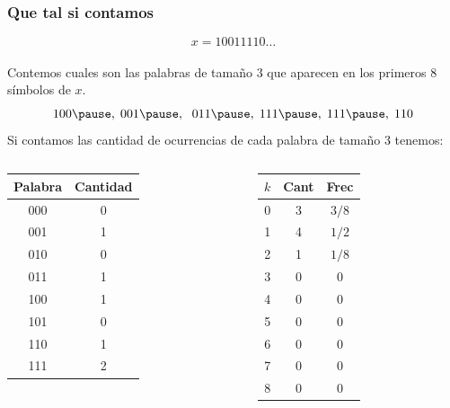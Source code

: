 \documentclass[10pt,mathserif]{beamer}%
\begin{document}
\begin{frame}
  \frametitle{Que tal si contamos}
  $$x = 10011110\dots$$
  \\
  Contemos cuales son las palabras de tamaño 3 que aparecen en los primeros 8 símbolos de $x$.
  \pause
  $$100\pause, \; 001\pause, \ \; 011\pause,\; 111\pause,\; 111\pause,\; 110$$
  \pause
  Si contamos las cantidad de ocurrencias de cada palabra de tamaño 3 tenemos: 
  \begin{columns}
    \begin{column}{0.5\textwidth}
      \begin{center}
      \begin{tabular}{|c | c|} 
    \hline
    Palabra & Cantidad \\ [0.5ex] 
    \hline
    000 & 0 \\ 
    \hline
    001 & 1 \\ 
    \hline
    010 & 0 \\ 
    \hline
    011 & 1 \\ 
    \hline
    100 & 1 \\ 
    \hline
    101 & 0 \\ 
    \hline
    110 & 1 \\ 
    \hline
    111 & 2 \\ 
    \hline
   \end{tabular}
  \end{center}
    \end{column}
    \begin{column}{0.5\textwidth}
      \pause
      \begin{center}
      \begin{tabular}{|c | c |  c|} 
        \hline
        $k$ & Cant &  Frec \\ [0.5ex] 
        \hline
        0 & 3 & $3/8$ \\ 
        \hline
        1 & 4 &$1/2$\\ 
        \hline
        2 & 1 &$1/8$  \\  
        \hline
        3 & 0 & 0 \\ 
        \hline
        4 & 0 & 0 \\
        \hline
        5 & 0 & 0  \\  
        \hline
        6 & 0 & 0  \\ 
        \hline
        7 & 0 & 0 \\
        \hline
        8 & 0 & 0 \\  
        \hline
       \end{tabular}
      \end{center}
    \end{column}
    \end{columns}
\end{frame}
\end{document}
